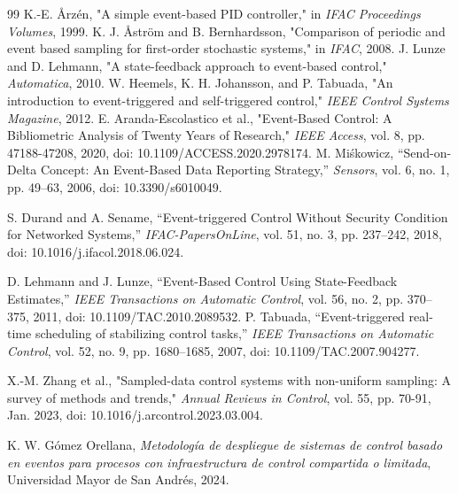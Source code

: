 \documentclass[conference]{IEEEtran}
\begin{document}
\begin{thebibliography}{99}
 K.-E. Årzén, "A simple event-based PID controller," in \textit{IFAC Proceedings Volumes}, 1999.
 K. J. Åström and B. Bernhardsson, "Comparison of periodic and event based sampling for first-order stochastic systems," in \textit{IFAC}, 2008.
 J. Lunze and D. Lehmann, "A state-feedback approach to event-based control," \textit{Automatica}, 2010.
 W. Heemels, K. H. Johansson, and P. Tabuada, "An introduction to event-triggered and self-triggered control," \textit{IEEE Control Systems Magazine}, 2012.
 E. Aranda-Escolastico et al., "Event-Based Control: A Bibliometric Analysis of Twenty Years of Research," \textit{IEEE Access}, vol. 8, pp. 47188-47208, 2020, doi: 10.1109/ACCESS.2020.2978174.
M. Miśkowicz, “Send-on-Delta Concept: An Event-Based Data Reporting Strategy,” \textit{Sensors}, vol. 6, no. 1, pp. 49–63, 2006, doi: 10.3390/s6010049.

S. Durand and A. Sename, “Event-triggered Control Without Security Condition for Networked Systems,” \textit{IFAC-PapersOnLine}, vol. 51, no. 3, pp. 237–242, 2018, doi: 10.1016/j.ifacol.2018.06.024.

D. Lehmann and J. Lunze, “Event-Based Control Using State-Feedback Estimates,” \textit{IEEE Transactions on Automatic Control}, vol. 56, no. 2, pp. 370–375, 2011, doi: 10.1109/TAC.2010.2089532.
P. Tabuada, “Event-triggered real-time scheduling of stabilizing control tasks,” \textit{IEEE Transactions on Automatic Control}, vol. 52, no. 9, pp. 1680–1685, 2007, doi: 10.1109/TAC.2007.904277.

X.-M. Zhang et al., "Sampled-data control systems with non-uniform sampling: A survey of methods and trends," \textit{Annual Reviews in Control}, vol. 55, pp. 70-91, Jan. 2023, doi: 10.1016/j.arcontrol.2023.03.004.

K. W. Gómez Orellana, \textit{Metodología de despliegue de sistemas de control basado en eventos para procesos con infraestructura de control compartida o limitada}, Universidad Mayor de San Andrés, 2024.
\end{thebibliography}
\end{document}
